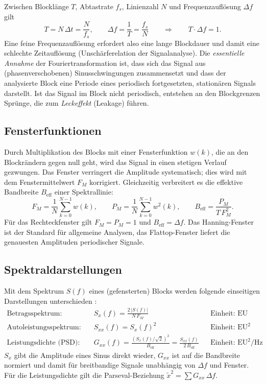 \documentclass[a4paper,11pt,parskip=half,toc=listof,bibliography=totoc]{scrartcl}
\newcommand{\Sx}{S_{x}}
\newcommand{\Sxx}{S_{xx}}
\newcommand{\Gxx}{G_{xx}}
\begin{document}
Zwischen Blocklänge $T$, Abtastrate $f_s$, Linienzahl $N$ und
Frequenzauflösung $\Delta f$ gilt
\begin{equation}
  T = N\,\Delta t = \frac{N}{f_s}, \qquad
  \Delta f = \frac{1}{T} = \frac{f_s}{N}
  \qquad\Rightarrow\qquad T\cdot\Delta f = 1 .
  \label{eq:unschaerfe}
\end{equation}
Eine feine Frequenzauflösung erfordert also eine lange Blockdauer und damit
eine schlechte Zeitauflösung (Unschärferelation der Signalanalyse). Die
\emph{essentielle Annahme} der Fouriertransformation ist, dass sich das Signal
aus (phasenverschobenen) Sinusschwingungen zusammensetzt und dass der
analysierte Block eine Periode eines periodisch fortgesetzten, stationären
Signals darstellt. Ist das Signal im Block nicht periodisch, entstehen an den
Blockgrenzen Sprünge, die zum \emph{Leckeffekt} (Leakage) führen.

\subsection{Fensterfunktionen}
Durch Multiplikation des Blocks mit einer Fensterfunktion $w(k)$, die an den
Blockrändern gegen null geht, wird das Signal in einen stetigen Verlauf
gezwungen. Das Fenster verringert die Amplitude systematisch; dies wird mit
dem Fenstermittelwert $F_M$ korrigiert. Gleichzeitig verbreitert es die
effektive Bandbreite $B_\text{eff}$ einer Spektrallinie:
\begin{equation}
  F_M = \frac{1}{N}\sum_{k=0}^{N-1} w(k), \qquad
  P_M = \frac{1}{N}\sum_{k=0}^{N-1} w^2(k), \qquad
  B_\text{eff} = \frac{P_M}{T\,F_M^2} .
\end{equation}
Für das Rechteckfenster gilt $F_M = P_M = 1$ und $B_\text{eff}=\Delta f$.
Das Hanning-Fenster ist der Standard für allgemeine Analysen, das
Flattop-Fenster liefert die genauesten Amplituden periodischer Signale.

\subsection{Spektraldarstellungen}
Mit dem Spektrum $S(f)$ eines (gefensterten) Blocks werden folgende
einseitigen Darstellungen unterschieden \cite{esefeld}:
\begin{align}
  \text{Betragsspektrum:}\quad & \Sx(f) = \frac{2\,|S(f)|}{N\,F_M}
     && \text{Einheit: EU} \\
  \text{Autoleistungsspektrum:}\quad & \Sxx(f) = \Sx(f)^2
     && \text{Einheit: EU}^2 \\
  \text{Leistungsdichte (PSD):}\quad & \Gxx(f) = \frac{\left(\Sx(f)/\sqrt{2}\right)^2}{B_\text{eff}} = \frac{\Sxx(f)}{2\,B_\text{eff}}
     && \text{Einheit: EU}^2/\text{Hz}
\end{align}
$\Sx$ gibt die Amplitude eines Sinus direkt wieder, $\Gxx$ ist auf die
Bandbreite normiert und damit für breitbandige Signale unabhängig von
$\Delta f$ und Fenster. Für die Leistungsdichte gilt die Parseval-Beziehung
$\tilde{x}^2 = \sum \Gxx\,\Delta f$.
\end{document}
